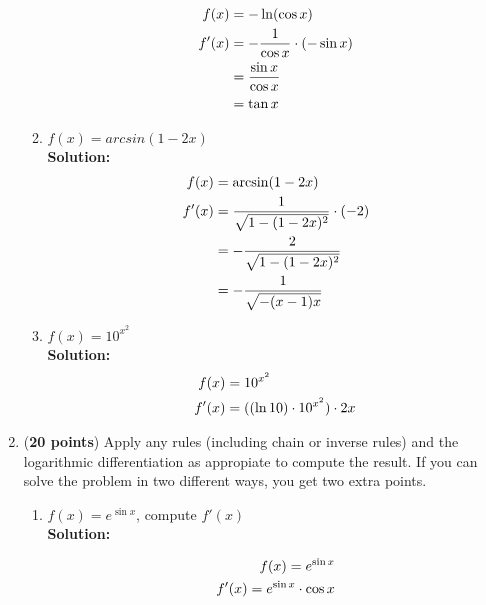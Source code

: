 \documentclass[a4paper]{article}
\begin{document}
\begin{enumerate}
\begin{enumerate}
	
\begin{align*}
	f(x) &= - \ln(\cos x)\notag\\
	f'(x) &= - \frac{1}{\cos x} \cdot (- \sin x)\notag\\
	&= \frac{\sin x}{\cos x}\notag\\
	&= \tan x\notag
\end{align*}	
	
	
	\item $f(x) = arcsin(1 - 2x)$\\
	\textbf{Solution:}\\
	
	
\begin{align*}
	f(x) &= \arcsin(1 - 2x)\notag\\
	f'(x) &= \frac{1}{\sqrt{1 - (1 - 2x)^2}} \cdot (-2)\notag\\
	&= - \frac{2}{\sqrt{1 - (1 - 2x)^2}}\notag\\
	&= -\frac{1}{\sqrt{-(x-1)x}}\notag
\end{align*}	
	
	
	\item $f(x) = 10^{x^2}$\\
	\textbf{Solution:}\\
		
\begin{align*}
	f(x) &= 10^{x^2}\notag\\
	f'(x) &= ((\ln 10) \cdot 10^{x^2}) \cdot 2x\notag
\end{align*}			
	
	
\end{enumerate}




\item (\textbf{20 points}) Apply any rules (including chain or inverse rules) and the logarithmic differentiation as appropiate to compute the result. If you can solve the problem in two different ways, you get two extra points.

	
\begin{enumerate}
	\item $f(x) = e^{\sin x}$, compute $f'(x)$\\
	\textbf{Solution:}\\
	
	
\begin{align*}
	f(x) =  e^{\sin x}\notag\\
	f'(x) = e^{\sin x} \cdot \cos x\notag
\end{align*}



\end{enumerate}
\end{enumerate}
\end{document}
